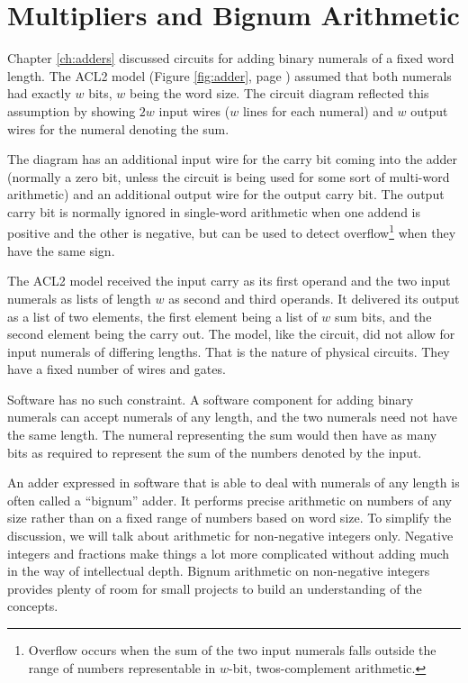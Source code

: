 \chapter{Multipliers and Bignum Arithmetic}
\label{ch:multipliers}


Chapter \ref{ch:adders} discussed circuits for adding binary numerals of a
fixed word length.
The ACL2 model (Figure \ref{fig:adder}, page \pageref{fig:adder})
assumed that both numerals had exactly $w$ bits, $w$ being the word size.
The circuit diagram reflected this assumption by
showing $2w$ input wires ($w$ lines for each numeral) and
$w$ output wires for the numeral denoting the sum.

The diagram has an additional input wire for the carry bit
coming into the adder (normally a zero bit, unless the circuit is being
used for some sort of multi-word arithmetic) and an additional output wire
for the output carry bit. 
The output carry bit is normally ignored in single-word arithmetic 
when one addend is positive and the other is negative,
but can be used to detect overflow\footnote{Overflow occurs
when the sum of the two input numerals falls outside
the range of numbers representable in $w$-bit, twos-complement
arithmetic.}
when they have the same sign.

The ACL2 model received the input carry as its first operand
and the two input numerals as lists of length $w$ as second and third operands.
It delivered its output as a list of two elements,
the first element being a list of $w$ sum bits,
and the second element being the carry out.
The model, like the circuit, did not allow for input numerals
of differing lengths.
That is the nature of physical circuits.
They have a fixed number of wires and gates.

Software has no such constraint.
A software component for adding binary numerals can accept
numerals of any length, and the two numerals need not have the same length.
The numeral representing the sum would then have as many bits as
required to represent the sum of the numbers
denoted by the input.

An adder expressed in software that is able to deal with numerals
of any length is often called a ``bignum'' adder.
It performs precise arithmetic on numbers of any size 
rather than on a fixed range of numbers based on word size.
To simplify the discussion, we will talk about arithmetic
for non-negative integers only.
Negative integers and fractions make things a lot more complicated
without adding much in the way of intellectual depth.
Bignum arithmetic on non-negative integers provides plenty of room 
for small projects to build an understanding of the concepts.

